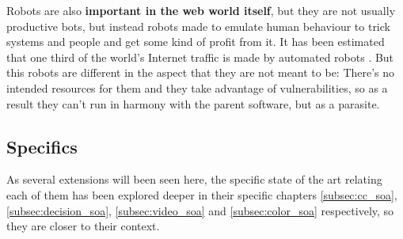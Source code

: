 Robots are also \textbf{important in the web world itself}, but they are not usually productive bots, but instead robots made to emulate human behaviour to trick systems and people and get some kind of profit from it. It has been estimated that one third of the world's Internet traffic is made by automated robots \cite{ref:robots_in_the_web}. But this robots are different in the aspect that they are not meant to be: There's no intended resources for them and they take advantage of vulnerabilities, so as a result they can't run in harmony with the parent software, but as a parasite.

\subsection{Specifics}
As several extensions will been seen here, the specific state of the art relating each of them has been explored deeper in their specific chapters \ref{subsec:cc_soa}, \ref{subsec:decision_soa}, \ref{subsec:video_soa} and \ref{subsec:color_soa} respectively, so they are closer to their context.
